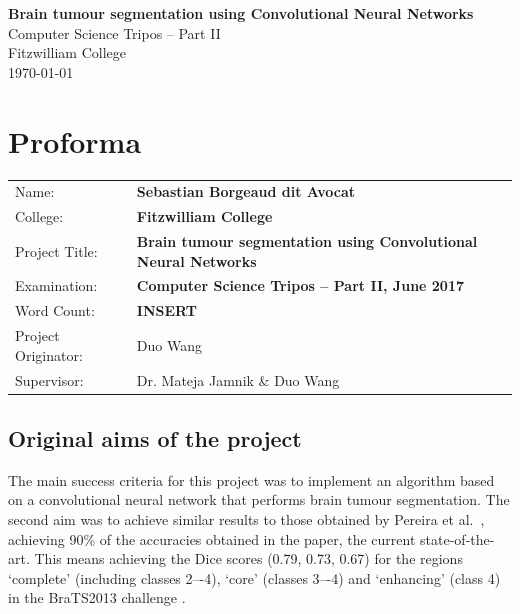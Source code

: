 \documentclass[12pt,a4paper,twoside,openright]{report}
\begin{document}





\pagestyle{empty}


\vspace*{60mm}
\begin{center}
\Huge
\textbf{Brain tumour segmentation using Convolutional Neural Networks} \\[5mm]
Computer Science Tripos -- Part II \\[5mm]
Fitzwilliam College \\[5mm]
\today  %
\end{center}


\pagestyle{plain}

\chapter*{Proforma}

{\large
\begin{tabular}{lp{12cm}}
Name:               & \bf Sebastian Borgeaud dit Avocat                       \\
College:            & \bf Fitzwilliam College                     \\
Project Title:      & \bf Brain tumour segmentation using Convolutional Neural Networks\\
Examination:        & \bf Computer Science Tripos -- Part II, June 2017  \\
Word Count:         & \bf INSERT  \\
Project Originator: & Duo Wang                    \\
Supervisor:         & Dr. Mateja Jamnik \& Duo Wang                    \\ 
\end{tabular}
}
\section*{Original aims of the project}
The main success criteria for this project was to implement an algorithm based on a convolutional neural network that performs brain tumour segmentation. The second aim was to achieve similar results to those obtained by Pereira et al.\ \cite{pereira}, achieving 90\% of the accuracies obtained in the paper, the current state-of-the-art. This means achieving the Dice scores (0.79, 0.73, 0.67) for the regions `complete' (including classes 2–-4), ‘core’ (classes 3–-4) and ‘enhancing’ (class 4) in the BraTS2013 challenge \cite{brats-proceedings}.
\end{document}
